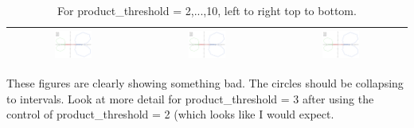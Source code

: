 \documentclass[a4paper,10pt]{article}
\begin{document}
\begin{table}[!ht]
\begin{tabular}{|c|c|c|}
  \includegraphics[width=0.3\textwidth]{product_threshold_test1_threshold-8.png} & 
  \includegraphics[width=0.3\textwidth]{product_threshold_test1_threshold-9.png} &
  \includegraphics[width=0.3\textwidth]{product_threshold_test1_threshold-10.png} \\\hline
 \end{tabular}
 \caption{For product\_threshold = 2,...,10, left to right top to bottom.}
\end{table}
 
 These figures are clearly showing something bad. The circles should be collapsing to intervals. Look at more detail for product\_threshold = 3 after using the control of product\_threshold = 2 (which looks like I would expect. 
 
 \clearpage
\end{document}
